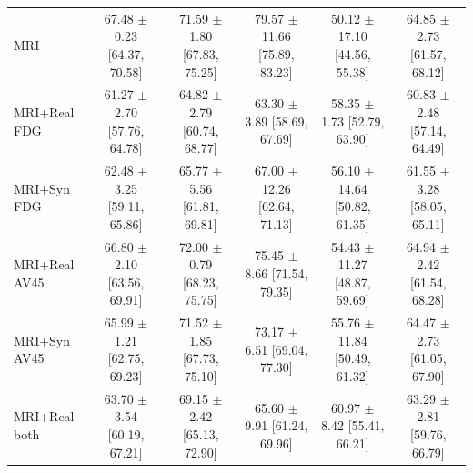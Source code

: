 \begin{landscape}
\begin{longtable}{lccccc}
MRI & \shortstack{67.48 $\pm$ 0.23\\{}[64.37, 70.58]} & \shortstack{71.59 $\pm$ 1.80\\{}[67.83, 75.25]} & \shortstack{79.57 $\pm$ 11.66\\{}[75.89, 83.23]} & \shortstack{50.12 $\pm$ 17.10\\{}[44.56, 55.38]} & \shortstack{64.85 $\pm$ 2.73\\{}[61.57, 68.12]} \\
MRI+Real FDG & \shortstack{61.27 $\pm$ 2.70\\{}[57.76, 64.78]} & \shortstack{64.82 $\pm$ 2.79\\{}[60.74, 68.77]} & \shortstack{63.30 $\pm$ 3.89\\{}[58.69, 67.69]} & \shortstack{58.35 $\pm$ 1.73\\{}[52.79, 63.90]} & \shortstack{60.83 $\pm$ 2.48\\{}[57.14, 64.49]} \\
MRI+Syn FDG & \shortstack{62.48 $\pm$ 3.25\\{}[59.11, 65.86]} & \shortstack{65.77 $\pm$ 5.56\\{}[61.81, 69.81]} & \shortstack{67.00 $\pm$ 12.26\\{}[62.64, 71.13]} & \shortstack{56.10 $\pm$ 14.64\\{}[50.82, 61.35]} & \shortstack{61.55 $\pm$ 3.28\\{}[58.05, 65.11]} \\
MRI+Real AV45 & \shortstack{66.80 $\pm$ 2.10\\{}[63.56, 69.91]} & \shortstack{72.00 $\pm$ 0.79\\{}[68.23, 75.75]} & \shortstack{75.45 $\pm$ 8.66\\{}[71.54, 79.35]} & \shortstack{54.43 $\pm$ 11.27\\{}[48.87, 59.69]} & \shortstack{64.94 $\pm$ 2.42\\{}[61.54, 68.28]} \\
MRI+Syn AV45 & \shortstack{65.99 $\pm$ 1.21\\{}[62.75, 69.23]} & \shortstack{71.52 $\pm$ 1.85\\{}[67.73, 75.10]} & \shortstack{73.17 $\pm$ 6.51\\{}[69.04, 77.30]} & \shortstack{55.76 $\pm$ 11.84\\{}[50.49, 61.32]} & \shortstack{64.47 $\pm$ 2.73\\{}[61.05, 67.90]} \\
MRI+Real both & \shortstack{63.70 $\pm$ 3.54\\{}[60.19, 67.21]} & \shortstack{69.15 $\pm$ 2.42\\{}[65.13, 72.90]} & \shortstack{65.60 $\pm$ 9.91\\{}[61.24, 69.96]} & \shortstack{60.97 $\pm$ 8.42\\{}[55.41, 66.21]} & \shortstack{63.29 $\pm$ 2.81\\{}[59.76, 66.79]} \\

\end{longtable}
\end{landscape}
